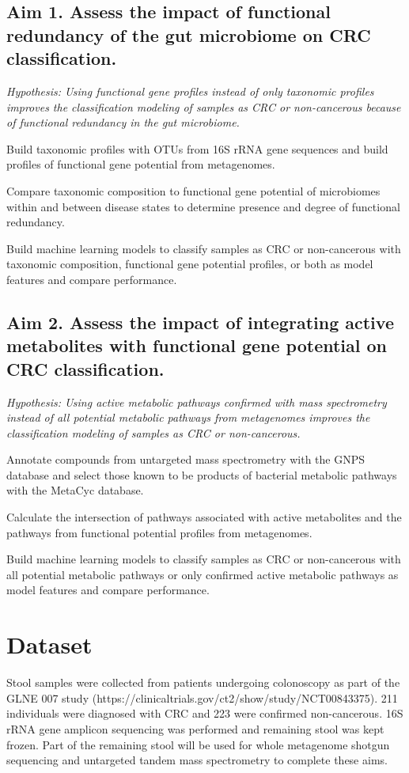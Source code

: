 \subsection*{Aim 1. Assess the impact of functional redundancy of the gut microbiome on CRC classification.}
\textit{Hypothesis: Using functional gene profiles instead of only taxonomic profiles improves the classification modeling of samples as CRC or non-cancerous because of functional redundancy in the gut microbiome.}
\begin{compactenum}[A.]
    \item Build taxonomic profiles with OTUs from 16S rRNA gene sequences and build profiles of functional gene potential from metagenomes.
    \item Compare taxonomic composition to functional gene potential of microbiomes within and between disease states to determine presence and degree of functional redundancy.
    \item Build machine learning models to classify samples as CRC or non-cancerous with taxonomic composition, functional gene potential profiles, or both as model features and compare performance.
\end{compactenum}

\subsection*{Aim 2. Assess the impact of integrating active metabolites with functional gene potential on CRC classification.}
\textit{Hypothesis: Using active metabolic pathways confirmed with mass spectrometry instead of all potential metabolic pathways from metagenomes improves the classification modeling of samples as CRC or non-cancerous.}
\begin{compactenum}[A.]
    \item Annotate compounds from untargeted mass spectrometry with the GNPS database and select those known to be products of bacterial metabolic pathways with the MetaCyc database.
    \item Calculate the intersection of pathways associated with active metabolites and the pathways from functional potential profiles from metagenomes.
    \item Build machine learning models to classify samples as CRC or non-cancerous with all potential metabolic pathways or only confirmed active metabolic pathways as model features and compare performance.
\end{compactenum}

\section*{Dataset}
Stool samples were collected from patients undergoing colonoscopy as part of the GLNE 007 study (https://clinicaltrials.gov/ct2/show/study/NCT00843375).
211 individuals were diagnosed with CRC and 223 were confirmed non-cancerous.
16S rRNA gene amplicon sequencing was performed and remaining stool was kept frozen.
Part of the remaining stool will be used for whole metagenome shotgun sequencing and untargeted tandem mass spectrometry to complete these aims.